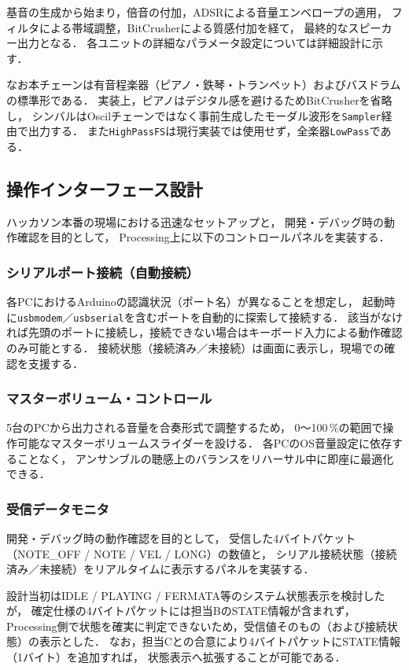基音の生成から始まり，倍音の付加，ADSRによる音量エンベロープの適用，
フィルタによる帯域調整，BitCrusherによる質感付加を経て，
最終的なスピーカー出力となる．
各ユニットの詳細なパラメータ設定については詳細設計に示す．

なお本チェーンは有音程楽器（ピアノ・鉄琴・トランペット）およびバスドラムの標準形である．
実装上，ピアノはデジタル感を避けるためBitCrusherを省略し，
シンバルはOscilチェーンではなく事前生成したモーダル波形を\texttt{Sampler}経由で出力する．
また\texttt{HighPassFS}は現行実装では使用せず，全楽器\texttt{LowPass}である．

\subsection{操作インターフェース設計}
ハッカソン本番の現場における迅速なセットアップと，
開発・デバッグ時の動作確認を目的として，
Processing上に以下のコントロールパネルを実装する．

\subsubsection{シリアルポート接続（自動接続）}
各PCにおけるArduinoの認識状況（ポート名）が異なることを想定し，
起動時に\texttt{usbmodem}／\texttt{usbserial}を含むポートを自動的に探索して接続する．
該当がなければ先頭のポートに接続し，接続できない場合はキーボード入力による動作確認のみ可能とする．
接続状態（接続済み／未接続）は画面に表示し，現場での確認を支援する．

\subsubsection{マスターボリューム・コントロール}
5台のPCから出力される音量を合奏形式で調整するため，
0〜100\,\%の範囲で操作可能なマスターボリュームスライダーを設ける．
各PCのOS音量設定に依存することなく，
アンサンブルの聴感上のバランスをリハーサル中に即座に最適化できる．

\subsubsection{受信データモニタ}
開発・デバッグ時の動作確認を目的として，
受信した4バイトパケット（NOTE\_OFF / NOTE / VEL / LONG）の数値と，
シリアル接続状態（接続済み／未接続）をリアルタイムに表示するパネルを実装する．

設計当初はIDLE / PLAYING / FERMATA等のシステム状態表示を検討したが，
確定仕様の4バイトパケットには担当BのSTATE情報が含まれず，
Processing側で状態を確実に判定できないため，受信値そのもの（および接続状態）の表示とした．
なお，担当Cとの合意により4バイトパケットにSTATE情報（1バイト）を追加すれば，
状態表示へ拡張することが可能である．


